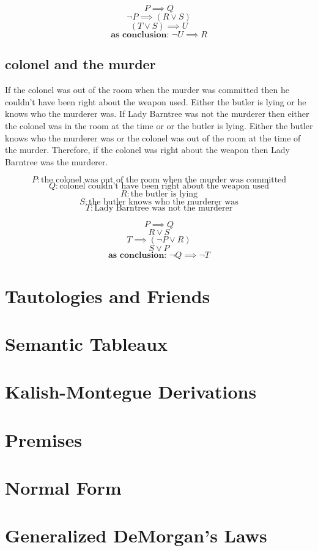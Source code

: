 \documentclass[a4paper,12pt]{article}
\begin{document}
\begin{equation} 
P \implies Q 
\end{equation}
\begin{equation} 
\neg P \implies (R \vee S)
\end{equation}
\begin{equation} 
(T \vee S) \implies U
\end{equation}
\begin{equation} 
\textbf{as conclusion: } \neg U \implies R
\end{equation}

\subsection{colonel and the murder}
If the colonel was out of the room when the murder was committed then he couldn't have been right about the weapon used.  Either the butler is lying or he knows who the murderer was.  If Lady Barntree was not the murderer then either the colonel was in the room at the time or or the butler is lying.  Either the butler knows who the murderer was or the colonel was out of the room at the time of the murder.  Therefore, if the colonel was right about the weapon then Lady Barntree was the murderer.

\[
P: \text{the colonel was out of the room when the murder was committed}  
\]
\[
Q: \text{colonel couldn't have been right about the weapon used} 
\]
\[
R: \text{the butler is lying} 
\]
\[
S: \text{the butler knows who the murderer was}
\]
\[
T: \text{Lady Barntree was not the murderer} 
\]

\begin{equation} 
P \implies Q 
\end{equation}
\begin{equation} 
R \vee S
\end{equation}
\begin{equation} 
T \implies (\neg P \vee R)
\end{equation}
\begin{equation} 
S \vee P
\end{equation}
\begin{equation} 
\textbf{as conclusion: } \neg Q \implies \neg T
\end{equation}
\section{Tautologies and Friends}

\section{Semantic Tableaux}

\section{Kalish-Montegue Derivations}

\section{Premises}

\section{Normal Form}

\section{Generalized DeMorgan's Laws}
\end{document}
